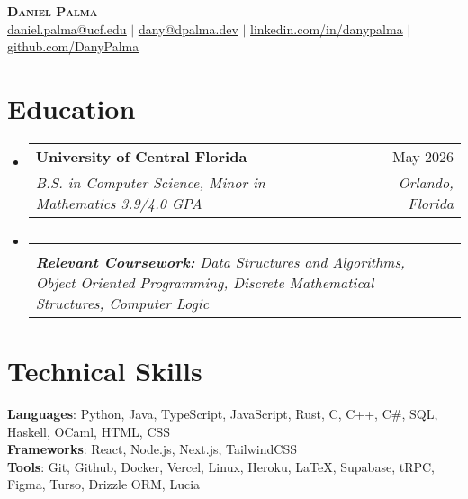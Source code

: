 \documentclass[letterpaper,11pt]{article}
\makeatletter
\newcommand{\resumeSubheading}[4]{
  \vspace{-2pt}\item
    \begin{tabular*}{0.97\textwidth}[t]{l@{\extracolsep{\fill}}r}
      \textbf{#1} & #2 \\
      \textit{\small#3} & \textit{\small #4} \\
    \end{tabular*}\vspace{-7pt}
}
\newcommand{\resumeSubHeadingListStart}{\begin{itemize}[leftmargin=0.15in, label={}]}
\newcommand{\resumeSubHeadingListEnd}{\end{itemize}}
\makeatother
\begin{document}

\begin{center}
    \textbf{\Huge \scshape Daniel Palma} \\ \vspace{1pt}
    \href{mailto:daniel.palma@ucf.edu}{\underline{daniel.palma@ucf.edu}} $|$ \href{mailto:dany@dpalma.dev}{\underline{dany@dpalma.dev}} $|$ 
    \href{https://linkedin.com/in/danypalma}{\underline{linkedin.com/in/danypalma}} $|$
    \href{https://github.com/DanyPalma}{\underline{github.com/DanyPalma}}
\end{center}


\section{Education}
  \resumeSubHeadingListStart
    \resumeSubheading
      {University of Central Florida}{May 2026}
      {B.S. in Computer Science, Minor in Mathematics 3.9/4.0 GPA}{Orlando, Florida}
    
      \vspace{-15pt}
    \resumeSubheading
      {}{}
      {\scriptsize{\textbf{Relevant Coursework: }Data Structures and Algorithms, Object Oriented Programming, Discrete Mathematical Structures, Computer Logic}}{}
  \resumeSubHeadingListEnd

\section{Technical Skills}
\begin{itemize}[leftmargin=0.15in, label={}]
   \small{\item{
    \textbf{Languages}{: Python, Java, TypeScript, JavaScript, Rust, C, C++, C\#, SQL, Haskell, OCaml,  HTML, CSS} \\
    \textbf{Frameworks}{: React, Node.js, Next.js, TailwindCSS} \\
    \textbf{Tools}{: Git, Github, Docker, Vercel, Linux, Heroku, LaTeX, Supabase, tRPC, Figma, Turso, Drizzle ORM, Lucia} \\
   }}
\end{itemize}
\end{document}
